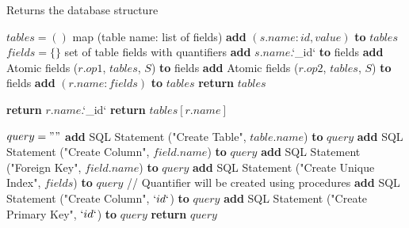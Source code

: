 \documentclass[oneside]{book}
\begin{document}
\begin{algorithm}
\caption{Returns the database structure}

\label{array-sum0}
\begin{algorithmic}[1]
	\State $tables = ()$ \Comment map (table name: list of fields)
		\State \textbf{add} $(s.name: {id, value})$ \textbf{to} $tables$
			\State $fields = \{\}$ \Comment set of table fields with quantifiers
			\State \textbf{add} $s.name$.`\_id` \textbf{to} fields
			\State \textbf{add} Atomic fields ($r.op1$, $tables$, $S$) \textbf{to} fields
				\State \textbf{add} Atomic fields ($r.op2$, $tables$, $S$) \textbf{to} fields
			\EndIf
			\State \textbf{add} $(r.name: fields)$ \textbf{to} $tables$
		\EndFor
	\EndFor
	\State \textbf{return} $tables$
\EndFunction
\end{algorithmic}

\label{array-sum1}
\begin{algorithmic}[1]
				\State \textbf{return} $r.name$.`\_id`
			\EndIf
			\State \textbf{return} $tables[r.name]$
\EndFunction
\end{algorithmic}

\label{array-sum2}
\begin{algorithmic}[1]
	\State $query = ""$
		\State \textbf{add} SQL Statement ("Create Table", $table.name$) \textbf{to} $query$
			\State \textbf{add} SQL Statement ("Create Column", $field.name$) \textbf{to} $query$
			\State \textbf{add} SQL Statement ("Foreign Key", $field.name$) \textbf{to} $query$
			 \State \textbf{add} SQL Statement ("Create Unique Index", $fields$) \textbf{to} $query$
			\EndIf
			 \State // Quantifier will be created using procedures
			\EndIf
		\EndFor
		\State \textbf{add} SQL Statement ("Create Column", $`id`$) \textbf{to} $query$
		\State \textbf{add} SQL Statement ("Create Primary Key", $`id`$) \textbf{to} $query$
	\EndFor
			\State \textbf{return} $query$
\EndFunction
\end{algorithmic}

\end{algorithm}

\newpage
\end{document}
